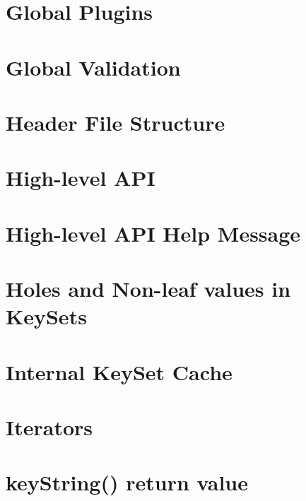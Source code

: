 \let\mypdfximage\pdfximage\def\pdfximage{\immediate\mypdfximage}\documentclass[twoside]{book}
\newcommand{\+}{\discretionary{\mbox{\scriptsize$\hookleftarrow$}}{}{}}
\begin{document}
\chapter{Global Plugins}
\label{doc_decisions_global_plugins_md}

\chapter{Global Validation}
\label{doc_decisions_global_validation_md}

\chapter{Header File Structure}
\label{doc_decisions_header_file_structure_md}

\chapter{High-\/level API}
\label{doc_decisions_high_level_api_md}

\chapter{High-\/level API Help Message}
\label{doc_decisions_highlevel_help_message_md}

\chapter{Holes and Non-\/leaf values in Key\+Sets}
\label{doc_decisions_holes_md}

\chapter{Internal Key\+Set Cache}
\label{doc_decisions_internal_cache_md}

\chapter{Iterators}
\label{doc_decisions_iterators_md}

\chapter{key\+String() return value}
\label{doc_decisions_key_string_return_value_md}

\end{document}
